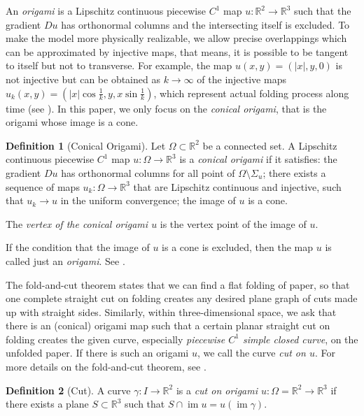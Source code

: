 \documentclass{amsart}
\theoremstyle{plain}
\theoremstyle{definition}
\newtheorem*{definition}{Definition}
\theoremstyle{remark}
\DeclareMathOperator{\im}{im}
\begin{document}
An \emph{origami} is a Lipschitz continuous piecewise $C^1$ map $u:\mathbb{R}^2\to\mathbb{R}^3$ such that the gradient $Du$ has orthonormal columns and the intersecting itself is excluded.
To make the model more physically realizable, we allow precise overlappings which can be approximated by injective maps, that means, it is possible to be tangent to itself but not to transverse.
For example, the map $u(x,y)=(|x|,y,0)$ is not injective but can be obtained as $k\to\infty$ of the injective maps $u_k(x,y)=(|x|\cos\frac1k,y,x\sin\frac1k)$, which represent actual folding process along time (see \cite{dacorogna2008lipschitz}).
In this paper, we only focus on the \emph{conical origami}, that is the origami whose image is a cone.


\begin{definition}[Conical Origami]%
Let $\Omega\subset \mathbb{R}^2$ be a connected set.
A Lipschitz continuous piecewise $C^1$ map $u:\Omega\to\mathbb{R}^3$ is a \emph{conical origami} if it satisfies:
the gradient $Du$ has orthonormal columns for all point of $\Omega\setminus\Sigma_u$;
there exists a sequence of maps $u_k:\Omega\to\mathbb{R}^3$ that are Lipschitz continuous and injective, such that $u_k\to u$ in the uniform convergence;
the image of $u$ is a cone.

The \emph{vertex of the conical origami $u$} is the vertex point of the image of $u$.
\end{definition}

If the condition that the image of $u$ is a cone is excluded, then the map $u$ is called just an \emph{origami}.
See \cite{dacorogna2008lipschitz}.

The fold-and-cut theorem states that we can find a flat folding of paper, so that one complete straight cut on folding creates any desired plane graph of cuts made up with straight sides.
Similarly, within three-dimensional space, we ask that there is an (conical) origami map such that a certain planar straight cut on folding creates the given curve, especially \emph{piecewise $C^1$ simple closed curve}, on the unfolded paper.
If there is such an origami $u$, we call the curve \emph{cut on $u$}.
For more details on the fold-and-cut theorem, see \cite{demaine2000folding}.


\begin{definition}[Cut]%
A curve $\gamma:I\to\mathbb{R}^2$ is a \emph{cut on origami $u:\Omega=\mathbb{R}^2\to\mathbb{R}^3$} if there exists a plane $S\subset\mathbb{R}^3$ such that $S\cap\im u=u(\im \gamma)$.
\end{definition}
\end{document}
